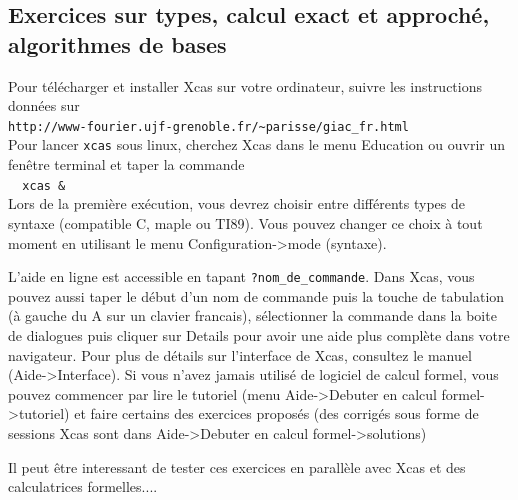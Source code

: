 \documentclass[a4paper,11pt]{article}
\begin{document}
\subsection{Exercices  sur types, calcul exact et approch\'e, 
algorithmes  de  bases}
Pour t\'el\'echarger et installer Xcas sur votre ordinateur, suivre
les instructions donn\'ees sur\\
\verb|http://www-fourier.ujf-grenoble.fr/~parisse/giac_fr.html|\\
Pour lancer {\tt xcas} sous linux, cherchez Xcas dans le menu
Education ou ouvrir un fen\^etre terminal et
taper la commande\\
\verb|  xcas & |\\
Lors de la premi\`ere ex\'ecution, vous devrez choisir entre
diff\'erents types de syntaxe (compatible C, maple ou TI89). Vous
pouvez changer ce choix \`a tout moment en utilisant le menu
Configuration->mode (syntaxe).


L'aide en ligne est accessible en tapant \verb|?nom_de_commande|.
Dans Xcas, vous pouvez aussi taper le d\'ebut d'un
nom de commande puis la touche de tabulation (\`a gauche du A sur
un clavier francais), s\'electionner la commande dans la boite
de dialogues puis cliquer sur Details pour avoir une aide plus
compl\`ete dans votre navigateur. Pour plus de d\'etails sur
l'interface de Xcas, consultez le manuel (Aide->Interface).
Si vous n'avez jamais utilis\'e de logiciel de calcul formel,
vous pouvez commencer par lire le tutoriel (menu Aide->Debuter en
calcul formel->tutoriel) et faire certains des exercices 
propos\'es (des corrig\'es sous forme de sessions Xcas sont 
dans Aide->Debuter en calcul formel->solutions)

Il peut \^etre interessant de tester ces exercices
en parall\`ele avec Xcas et des calculatrices
formelles....
\end{document}
